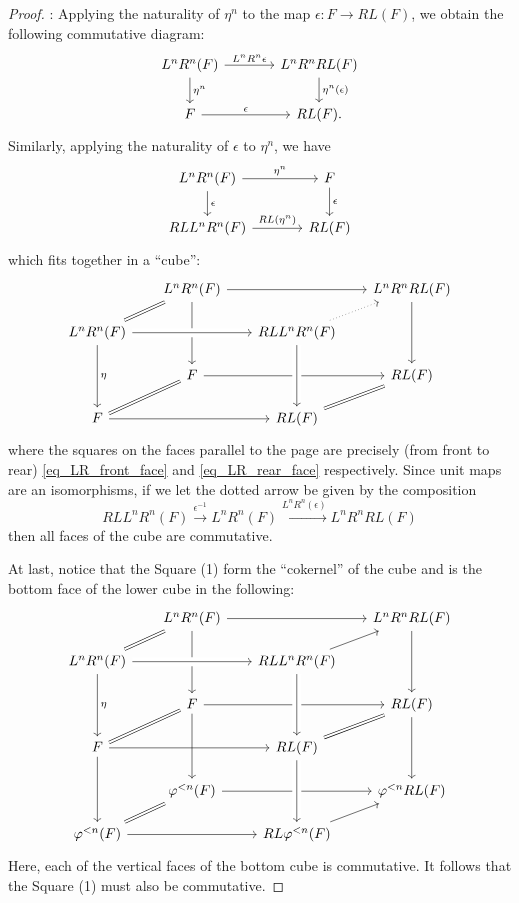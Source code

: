\begin{proof}
 : Applying the naturality of
$\eta^n$ to the map $\epsilon: F \to RL(F)$, we obtain the 
following commutative diagram:
\begin{equation}\label{eq_LR_rear_face}
\begin{tikzcd}[column sep=large]
L^nR^n(F) \arrow{r}{L^nR^n\epsilon} \arrow{d}{\eta^n} &
L^nR^nRL(F) \arrow{d}{\eta^n(\epsilon)} \\
F \arrow{r}{\epsilon} &
RL(F).
\end{tikzcd}
\end{equation}
Similarly, applying the naturality of $\epsilon$ to $\eta^n$, we
have
\begin{equation}\label{eq_LR_front_face}
\begin{tikzcd}[column sep=large]
L^nR^n(F) \arrow{d}{\epsilon} \arrow{r}{\eta^n} &
F \arrow{d}{\epsilon} \\
RLL^nR^n(F) \arrow{r}{RL(\eta^n)} &
RL(F)
\end{tikzcd}
\end{equation}
which fits together in a ``cube'':
\[
\begin{tikzcd}[row sep=scriptsize, column sep=scriptsize]
& L^nR^n(F) \arrow[equals]{dl}\arrow{rr}\arrow{dd}{\eta} & & 
   L^nR^nRL(F) \arrow{dd} \\
L^nR^n(F) \arrow[crossing over]{rr}\arrow{dd}{\eta} & & RLL^nR^n(F) 
   \arrow[dotted]{ur} \\
& F \arrow[equals]{dl}\arrow{rr} & & RL(F) 
   \arrow[equals]{dl} \\
F \arrow{rr} & & RL(F) \arrow[crossing over, leftarrow]{uu}
\end{tikzcd}
\]
where the squares on the faces parallel to the page are precisely 
(from front to rear) \eqref{eq_LR_front_face} and 
\eqref{eq_LR_rear_face} respectively. Since unit maps are an 
isomorphisms, if we let the dotted arrow be given by the 
composition
\[
RLL^nR^n(F) \stackrel{\epsilon^{-1}}{\to} L^nR^n(F) 
\xrightarrow{L^nR^n(\epsilon)} L^nR^nRL(F)
\]
then all faces of the cube are commutative.

At last, notice that the Square (1) form the ``cokernel'' of the
cube and is the bottom face of the lower cube in the following:
\[
\begin{tikzcd}[row sep=scriptsize, column sep=scriptsize]
& L^nR^n(F) \arrow[equals]{dl}\arrow{rr}\arrow{dd}{\eta} & & 
   L^nR^nRL(F) \arrow{dd} \\
L^nR^n(F) \arrow[crossing over]{rr}\arrow{dd}{\eta} & & 
   RLL^nR^n(F) \arrow{ur} \\
& F \arrow[equals]{dl}\arrow{rr} \arrow{dd} & & RL(F) \arrow{dd}
   \arrow[equals]{dl} \\
F \arrow{rr} \arrow{dd} & & 
   RL(F) \arrow[crossing over, leftarrow]{uu} \\
& \tlHI{n}(F) \arrow[equals]{dl}\arrow{rr} & & 
   \tlHI{n} RL(F) \arrow[leftarrow]{dl}\\
\tlHI{n}(F) \arrow{rr} & & 
   RL\tlHI{n}(F) \arrow[crossing over, leftarrow]{uu} 
\end{tikzcd}
\]
Here, each of the vertical faces of the bottom cube is commutative.
It follows that the Square (1) must also be commutative.


\end{proof}
